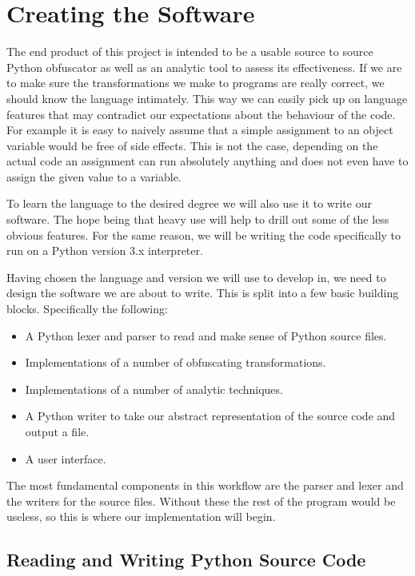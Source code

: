 \documentclass[twoside,a4paper]{report}
\begin{document}
\section{Creating the Software}

The end product of this project is intended to be a usable source to source Python obfuscator as well as an analytic tool
to assess its effectiveness. If we are to make sure the transformations we make to programs are really correct, we should
know the language intimately. This way we can easily pick up on language features that may contradict our
expectations about the behaviour of the code. For example it is easy to naively assume that a simple assignment to an object
variable would be free of side effects. This is not the case, depending on the actual code an assignment can run absolutely
anything \cite{pyprop} and does not even have to assign the given value to a variable.

To learn the language to the desired degree we will also use it to write our software. The hope being that heavy use will help to
drill out some of the less obvious features. For the same reason, we will be writing the code specifically to run on a Python version 3.x
interpreter.

Having chosen the language and version we will use to develop in, we need to design the software we are about to write. This is split into a few basic building
blocks. Specifically the following:

\begin{itemize}
\item A Python lexer and parser to read and make sense of Python source files.
\item Implementations of a number of obfuscating transformations.
\item Implementations of a number of analytic techniques.
\item A Python writer to take our abstract representation of the source code and output a file.
\item A user interface.
\end{itemize}

The most fundamental components in this workflow are the parser and lexer and the writers for the source files.
Without these the rest of the program would be useless, so this is where our implementation will begin.

\subsection{Reading and Writing Python Source Code}
\end{document}

